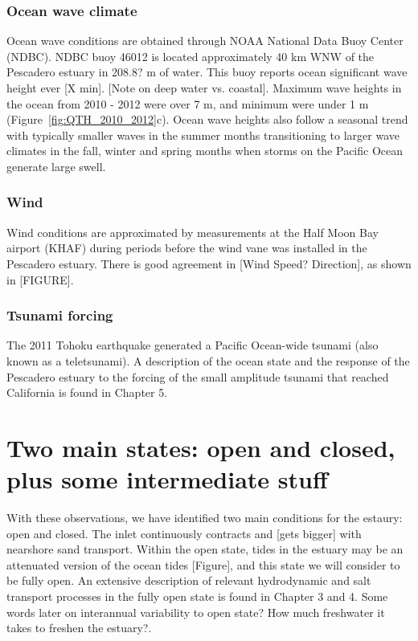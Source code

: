 \subsubsection{Ocean wave climate}
Ocean wave conditions are obtained through NOAA National
Data Buoy Center (NDBC). NDBC buoy 46012 is located approximately 40 km
WNW of the Pescadero estuary in 208.8? m of water. This buoy reports
ocean significant wave height ever [X min]. [Note on deep water vs.
coastal]. Maximum wave heights in the ocean from 2010 - 2012 were over 7 m,
and minimum were under 1 m (Figure~\ref{fig:QTH_2010_2012}c). Ocean wave heights also follow a seasonal trend with typically smaller waves in the summer months transitioning to larger wave climates in the fall, winter and spring months when storms on the Pacific Ocean generate large swell.

\subsubsection{Wind}
Wind conditions are approximated by measurements at the Half Moon Bay airport (KHAF) during periods before the wind vane was installed in the Pescadero estuary.  There is good agreement in [Wind Speed? Direction], as shown in [FIGURE].

\subsubsection{Tsunami forcing}
The 2011 Tohoku earthquake generated a Pacific Ocean-wide tsunami (also known as a teletsunami). A description of the ocean state and the response of the Pescadero estuary to the forcing of the small amplitude tsunami that reached California is found in Chapter 5.


\section{Two main states: open and closed, plus some intermediate stuff}
\label{betterlabelmaybe}

With these observations, we have identified two main conditions for the
estaury: open and closed.  The inlet continuously contracts and [gets
bigger] with nearshore sand transport. Within the open state, tides in
the estuary may be an attenuated version of the ocean tides [Figure],
and this state we will consider to be fully open. An extensive
description of relevant hydrodynamic and salt transport processes in the
fully open state is found in Chapter 3 and 4. {Some words later on
interannual variability to open state? How much freshwater it takes to
freshen the estuary?}.

